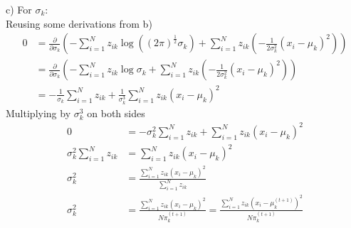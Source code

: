 c) For $\sigma_k$:\\
Reusing some derivations from b)
\begin{align*}
0 &= \frac{\partial}{\partial \sigma_k} \left(
	-\sum_{i=1}^N z_{ik} \log \left((2\pi)^{\frac{1}{2}} \sigma_k\right) +
	\sum_{i=1}^N z_{ik}  \left(
			-\frac{1}{2\sigma_k^2} \left( x_i - \mu_k \right)^2
		\right)
\right)\\
&= \frac{\partial}{\partial \sigma_k} \left(
	-\sum_{i=1}^N z_{ik} \log  \sigma_k +
	\sum_{i=1}^N z_{ik}  \left(
			-\frac{1}{2\sigma_k^2} \left( x_i - \mu_k \right)^2
		\right)
\right)\\
&= -\frac{1}{\sigma_k}\sum_{i=1}^N z_{ik} + \frac{1}{\sigma_k^3}\sum_{i=1}^N z_{ik} \left( x_i - \mu_k \right)^2
\end{align*}
Multiplying by $\sigma_k^3$ on both sides
\begin{align*}
0 &= -\sigma_k^2 \sum_{i=1}^N z_{ik} + \sum_{i=1}^N z_{ik} \left( x_i - \mu_k \right)^2\\
\sigma_k^2 \sum_{i=1}^N z_{ik} &= \sum_{i=1}^N z_{ik} \left( x_i - \mu_k \right)^2\\
\sigma_k^2 &= \frac{\sum_{i=1}^N z_{ik} \left( x_i - \mu_k \right)^2}{\sum_{i=1}^N z_{ik}}\\
\sigma_k^2 &= \frac{\sum_{i=1}^N z_{ik} \left( x_i - \mu_k \right)^2}{N\pi_k^{(t+1)}} = 
	\frac{\sum_{i=1}^N z_{ik} \left( x_i - \mu_k^{(t+1)} \right)^2}{N\pi_k^{(t+1)}}
\end{align*}